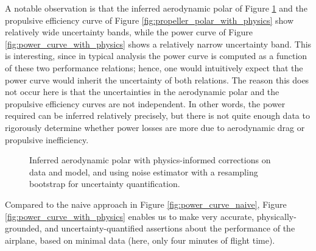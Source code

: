 \documentclass[conf]{new-aiaa}
\begin{document}
    A notable observation is that the inferred aerodynamic polar of Figure \ref{fig:aerodynamic_polar_with_physics} and the propulsive efficiency curve of Figure \ref{fig:propeller_polar_with_physics} show relatively wide uncertainty bands, while the power curve of Figure \ref{fig:power_curve_with_physics} shows a relatively narrow uncertainty band. This is interesting, since in typical analysis the power curve is computed as a function of these two performance relations; hence, one would intuitively expect that the power curve would inherit the uncertainty of both relations. The reason this does not occur here is that the uncertainties in the aerodynamic polar and the propulsive efficiency curves are not independent. In other words, the power required can be inferred relatively precisely, but there is not quite enough data to rigorously determine whether power losses are more due to aerodynamic drag or propulsive inefficiency.

    \begin{figure}[h]
        \centering
        \caption{Inferred aerodynamic polar with physics-informed corrections on data and model, and using noise estimator with a resampling bootstrap for uncertainty quantification.}
        \label{fig:aerodynamic_polar_with_physics}
    \end{figure}

    Compared to the naive approach in Figure \ref{fig:power_curve_naive}, Figure \ref{fig:power_curve_with_physics} enables us to make very accurate, physically-grounded, and uncertainty-quantified assertions about the performance of the airplane, based on minimal data (here, only four minutes of flight time).
\end{document}
